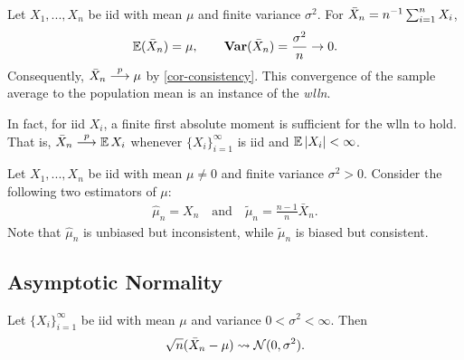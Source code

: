 \documentclass[a4paper,12pt]{article}
\begin{document}
\begin{example}\label{eg-sample-mean}
	Let $X_1,...,X_n$ be \gls{iid} with mean $\mu$ and finite variance $\sigma^2$.
	For $\bar X_n=n^{-1}\sum_{i=1}^nX_i$,
	\begin{align*}
		\operatorname{\mathbb{E}}(\bar X_n)=\mu,
		\qquad
		\operatorname{\text{\textrm{\upshape\textbf{Var}}}}(\bar X_n)=\frac{\sigma^2}{n}\to0.
	\end{align*}
	Consequently, $\bar X_n\overset{p}{\longrightarrow}\mu$ by \autoref{cor-consistency}.
	This convergence of the sample average to the population mean is an instance of the \emph{\gls{wlln}}.
\end{example}

\begin{remark}
	In fact, for \gls{iid} $X_i$, a finite first absolute moment is sufficient for the \gls{wlln} to hold.
	That is, $\bar X_n\overset{p}{\longrightarrow}\operatorname{\mathbb{E}} X_i$ whenever $\{X_i\}_{i=1}^{\infty}$ is \gls{iid} and $\operatorname{\mathbb{E}}|X_i|<\infty$.
\end{remark}

\begin{example}
	Let $X_1,...,X_n$ be \gls{iid} with mean $\mu\neq0$ and finite variance $\sigma^2>0$.
	Consider the following two estimators of $\mu$:
	\begin{align}
		\widehat\mu_n=X_n
		\quad\text{and}\quad
		\widetilde\mu_n=\frac{n-1}{n}\bar X_n.
	\end{align}
	Note that $\widehat\mu_n$ is unbiased but inconsistent,
	while $\widetilde\mu_n$ is biased but consistent.
\end{example}

\subsection{Asymptotic Normality}


\begin{theorem}\label{thm-clt}
	Let $\{X_i\}_{i=1}^{\infty}$ be \gls{iid} with mean $\mu$ and variance $0<\sigma^2<\infty$.
	Then
	\begin{align}
		\sqrt{n}(\bar X_n-\mu)\overset{}{\leadsto}\operatorname{\mathcal{N}}(0,\sigma^2).
	\end{align}
\end{theorem}
\end{document}
